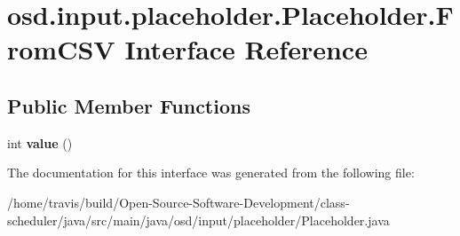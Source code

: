 \hypertarget{interfaceosd_1_1input_1_1placeholder_1_1_placeholder_1_1_from_c_s_v}{\section{osd.\-input.\-placeholder.\-Placeholder.\-From\-C\-S\-V Interface Reference}
\label{interfaceosd_1_1input_1_1placeholder_1_1_placeholder_1_1_from_c_s_v}
}
\subsection*{Public Member Functions}
\begin{DoxyCompactItemize}
\item 
\hypertarget{interfaceosd_1_1input_1_1placeholder_1_1_placeholder_1_1_from_c_s_v_a01eadbd76109de58aab6f1b9c3844db4}{int {\bfseries value} ()}\label{interfaceosd_1_1input_1_1placeholder_1_1_placeholder_1_1_from_c_s_v_a01eadbd76109de58aab6f1b9c3844db4}

\end{DoxyCompactItemize}


The documentation for this interface was generated from the following file\-:\begin{DoxyCompactItemize}
\item 
/home/travis/build/\-Open-\/\-Source-\/\-Software-\/\-Development/class-\/scheduler/java/src/main/java/osd/input/placeholder/Placeholder.\-java\end{DoxyCompactItemize}
